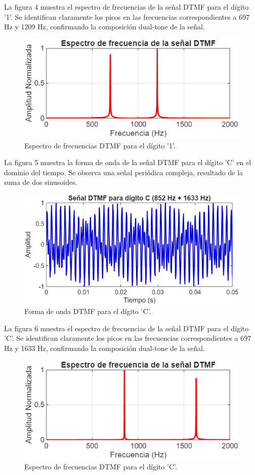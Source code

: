 \documentclass[journal]{IEEEtran} %
\begin{document}
La figura 4 muestra el espectro de frecuencias de la señal DTMF para el dígito '1'. Se identifican claramente los picos en las frecuencias correspondientes a 697 Hz y 1209 Hz, confirmando la composición dual-tone de la señal.
\begin{figure}[htbp]
    \centerline{\includegraphics[width=0.8\columnwidth]{Figure_4.png}}
    \caption{Espectro de frecuencias DTMF para el dígito '1'.}
    \label{fig}
\end{figure}


La figura 5 muestra la forma de onda de la señal DTMF para el dígito 'C' en el dominio del tiempo. Se observa una señal periódica compleja, resultado de la suma de dos sinusoides.
\begin{figure}[htbp]
    \centerline{\includegraphics[width=0.8\columnwidth]{Figure_5.png}}
    \caption{Forma de onda DTMF para el dígito 'C'.}
    \label{fig}
\end{figure}


La figura 6 muestra el espectro de frecuencias de la señal DTMF para el dígito 'C'. Se identifican claramente los picos en las frecuencias correspondientes a 697 Hz y 1633 Hz, confirmando la composición dual-tone de la señal.
\begin{figure}[htbp]
    \centerline{\includegraphics[width=0.8\columnwidth]{Figure_6.png}}
    \caption{Espectro de frecuencias DTMF para el dígito 'C'.}
    \label{fig} 
\end{figure}
\end{document}
